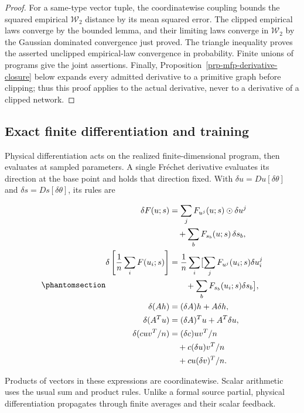 \documentclass[
  11pt,
]{article}
\theoremstyle{definition}
\theoremstyle{plain}
\theoremstyle{plain}
\theoremstyle{plain}
\theoremstyle{remark}
\begin{document}
\begin{proof}
For a same-type vector tuple, the coordinatewise coupling bounds the
squared empirical \(\mathcal W_2\) distance by its mean squared error.
The clipped empirical laws converge by the bounded lemma, and their
limiting laws converge in \(\mathcal W_2\) by the Gaussian dominated
convergence just proved. The triangle inequality proves the asserted
unclipped empirical-law convergence in probability. Finite unions of
programs give the joint assertions. Finally,
Proposition~\ref{prp-mfp-derivative-closure} below expands every
admitted derivative to a primitive graph before clipping; thus this
proof applies to the actual derivative, never to a derivative of a
clipped network.
\end{proof}

\subsection{Exact finite differentiation and
training}\label{sec-mfp-physical-differentiation}

Physical differentiation acts on the realized finite-dimensional
program, then evaluates at sampled parameters. A single Fréchet
derivative evaluates its direction at the base point and holds that
direction fixed. With \(\delta u=Du[\delta\theta]\) and
\(\delta s=Ds[\delta\theta]\), its rules are

\begin{equation}\protect\phantomsection\label{eq-mfp-forward-ad}{
\begin{aligned}
\delta F(u;s)
&=\sum_j F_{u^j}(u;s)\odot\delta u^j\\
&\quad+\sum_b F_{s_b}(u;s)\,\delta s_b,\\
\delta\left[\frac1n\sum_iF(u_i;s)\right]
&=\frac1n\sum_i\bigl[\sum_jF_{u^j}(u_i;s)\delta u_i^j\\
&\qquad+\sum_bF_{s_b}(u_i;s)\delta s_b\bigr],\\
\delta(Ah)&=(\delta A)h+A\delta h,\\
\delta(A^Tu)&=(\delta A)^Tu+A^T\delta u,\\
\delta(cuv^T/n)&=(\delta c)uv^T/n\\
&\quad+c(\delta u)v^T/n\\
&\quad+cu(\delta v)^T/n.
\end{aligned}
}\end{equation}

Products of vectors in these expressions are coordinatewise. Scalar
arithmetic uses the usual sum and product rules. Unlike a formal source
partial, physical differentiation propagates through finite averages and
their scalar feedback.
\end{document}
